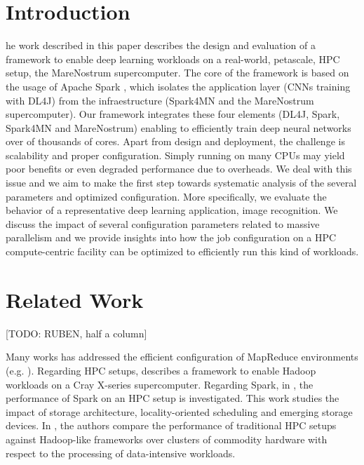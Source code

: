 \documentclass[journal]{IEEEtran}
\begin{document}





\section{Introduction}

 he work described in this paper describes the design and evaluation of a framework to enable deep learning workloads on a real-world, petascale, HPC setup, the MareNostrum supercomputer. The core of the framework is based on the usage of Apache Spark \cite{spark}, which isolates the application layer (CNNs training with DL4J) from the infraestructure (Spark4MN and the MareNostrum supercomputer). Our framework integrates these four elements (DL4J, Spark, Spark4MN and MareNostrum) enabling to efficiently train deep neural networks over of thousands of cores. Apart from design and deployment, the challenge is scalability and proper configuration. Simply running on many CPUs may yield poor benefits or even degraded performance due to overheads. We deal with this issue and we aim to make the first step towards systematic analysis of the several parameters and optimized configuration. More specifically, we evaluate the behavior of a representative deep learning application, image recognition. We discuss the impact of several configuration parameters related to massive parallelism
and we provide insights into how the job configuration on a HPC compute-centric facility can be optimized to efficiently run this kind of workloads. 

\section{Related Work}
\label{sec:rw}

[TODO: RUBEN, half a column]

Many works has addressed the efficient configuration of MapReduce environments (e.g. \cite{HDB, HBY13}). Regarding HPC setups, \cite{michael2014} describes a framework to enable Hadoop workloads on a Cray X-series supercomputer. Regarding Spark, in \cite{wang2014}, the performance of Spark on an HPC setup is investigated. This work studies the impact of storage architecture, locality-oriented scheduling and emerging storage devices. In \cite{jha2014}, the authors compare the performance of traditional HPC setups against Hadoop-like frameworks over clusters of commodity hardware with respect to the processing of data-intensive workloads. 
\end{document}
